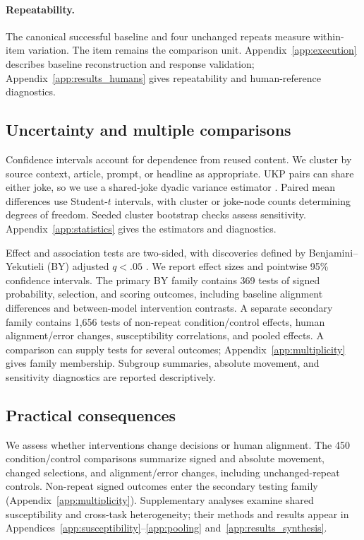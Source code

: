 \documentclass[11pt]{article}
\begin{document}
\paragraph{Repeatability.}
The canonical successful baseline and four unchanged repeats measure within-item variation. The item remains the comparison unit. Appendix~\ref{app:execution} describes baseline reconstruction and response validation; Appendix~\ref{app:results_humans} gives repeatability and human-reference diagnostics.

\subsection{Uncertainty and multiple comparisons}
Confidence intervals account for dependence from reused content. We cluster by source context, article, prompt, or headline as appropriate. UKP pairs can share either joke, so we use a shared-joke dyadic variance estimator \citep{aronow2015}. Paired mean differences use Student-$t$ intervals, with cluster or joke-node counts determining degrees of freedom. Seeded cluster bootstrap checks assess sensitivity. Appendix~\ref{app:statistics} gives the estimators and diagnostics.

Effect and association tests are two-sided, with discoveries defined by Benjamini--Yekutieli (BY) adjusted $q<.05$ \citep{benjamini2001}. We report effect sizes and pointwise 95\% confidence intervals. The primary BY family contains 369 tests of signed probability, selection, and scoring outcomes, including baseline alignment differences and between-model intervention contrasts. A separate secondary family contains 1,656 tests of non-repeat condition/control effects, human alignment/error changes, susceptibility correlations, and pooled effects. A comparison can supply tests for several outcomes; Appendix~\ref{app:multiplicity} gives family membership. Subgroup summaries, absolute movement, and sensitivity diagnostics are reported descriptively.

\subsection{Practical consequences}
We assess whether interventions change decisions or human alignment. The 450 condition/control comparisons summarize signed and absolute movement, changed selections, and alignment/error changes, including unchanged-repeat controls. Non-repeat signed outcomes enter the secondary testing family (Appendix~\ref{app:multiplicity}). Supplementary analyses examine shared susceptibility and cross-task heterogeneity; their methods and results appear in Appendices~\ref{app:susceptibility}--\ref{app:pooling} and~\ref{app:results_synthesis}.
\end{document}
